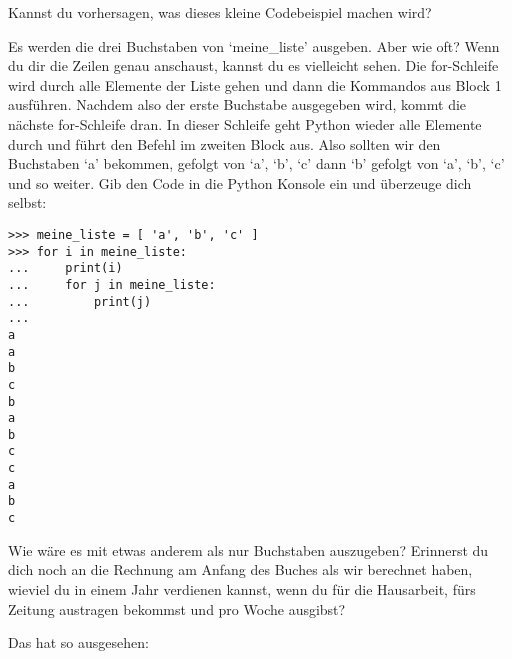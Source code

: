 Kannst du vorhersagen, was dieses kleine Codebeispiel machen wird?
\par
Es werden die drei Buchstaben von `meine\_liste' ausgeben. Aber wie oft? Wenn du dir die Zeilen genau anschaust, kannst du es vielleicht sehen. Die for-Schleife wird durch alle Elemente der Liste gehen und dann die Kommandos aus Block 1 ausführen. Nachdem also der erste Buchstabe ausgegeben wird, kommt die nächste for-Schleife dran. In dieser Schleife geht Python wieder alle Elemente durch und führt den Befehl im zweiten Block aus. Also sollten wir den Buchstaben `a' bekommen, gefolgt von `a', `b', `c' dann `b' gefolgt von `a', `b', `c' und so weiter. Gib den Code in die Python Konsole ein und überzeuge dich selbst:

\begin{Verbatim}[frame=single]
>>> meine_liste = [ 'a', 'b', 'c' ]
>>> for i in meine_liste:
...     print(i)
...     for j in meine_liste:
...         print(j)
...
a
a
b
c
b
a
b
c
c
a
b
c
\end{Verbatim}


Wie wäre es mit etwas anderem als nur Buchstaben auszugeben? Erinnerst du dich noch an die Rechnung am Anfang des Buches als wir berechnet haben, wieviel du in einem Jahr verdienen kannst, wenn du  für die Hausarbeit,  fürs Zeitung austragen bekommst und  pro Woche ausgibst?
\par
\noindent
Das hat so ausgesehen:

